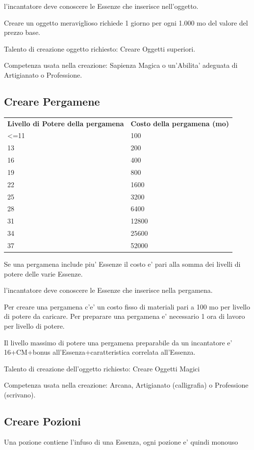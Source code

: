 \documentclass[a4paper,11pt,twoside,openany]{book}
\begin{document}
l'incantatore deve conoscere le Essenze che inserisce nell'oggetto.

Creare un oggetto meraviglioso richiede 1 giorno per ogni 1.000 mo del valore del prezzo base.

Talento di creazione oggetto richiesto: Creare Oggetti superiori.

Competenza usata nella creazione: Sapienza Magica o un'Abilita' adeguata
di Artigianato o Professione.

\subsection{Creare Pergamene}

\begin{tabular}{ll}
\toprule
\textbf{Livello di Potere della pergamena} & \textbf{Costo della pergamena (mo)}\tabularnewline
\textless=11 & 100\tabularnewline
13 & 200\tabularnewline
16 & 400\tabularnewline
19 & 800\tabularnewline
22 & 1600\tabularnewline
25 & 3200\tabularnewline
28 & 6400\tabularnewline
31 & 12800\tabularnewline
34 & 25600\tabularnewline
37 & 52000\tabularnewline
\end{tabular}

\bigskip

Se una pergamena include piu' Essenze il costo e' pari alla somma dei livelli di potere delle varie Essenze.

l'incantatore deve conoscere le Essenze che inserisce nella pergamena.

Per creare una pergamena c'e' un costo fisso di materiali pari a 100 mo per livello di potere da caricare. Per preparare una pergamena e' necessario 1 ora di lavoro per livello di potere.

Il livello massimo di potere una pergamena preparabile da un incantatore e' 16+CM+bonus all'Essenza+caratteristica correlata all'Essenza.

Talento di creazione dell'oggetto richiesto: Creare Oggetti Magici

Competenza usata nella creazione: Arcana, Artigianato (calligrafia) o Professione (scrivano).

\subsection{Creare Pozioni}

Una pozione contiene l'infuso di una Essenza, ogni pozione e' quindi monouso
\end{document}
